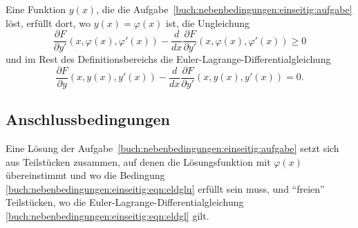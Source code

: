 \begin{satz}
Eine Funktion $y(x)$, die die
Aufgabe~\ref{buch:nebenbedingungen:einseitig:aufgabe}
löst, erfüllt dort, wo $y(x)=\varphi(x)$ ist, die Ungleichung
\begin{equation}
\frac{\partial F}{\partial y'}(x,\varphi(x),\varphi'(x))
-
\frac{d}{dx}\frac{\partial F}{\partial y'}(x,\varphi(x),\varphi'(x))
\ge
0
\label{buch:nebenbedingungen:einseitig:eqn:eldglu}
\end{equation}
und im Rest des Definitionsbereichs die Euler-Lagrange-Differentialgleichung
\begin{equation}
\frac{\partial F}{\partial y}(x,y(x),y'(x))
-
\frac{d}{dx}
\frac{\partial F}{\partial y'}(x,y(x),y'(x))
=
0.
\label{buch:nebenbedingungen:einseitig:eqn:eldgl}
\end{equation}
\end{satz}

%
%
\subsection{Anschlussbedingungen
\label{buch:nebenbedingungen:einseitig:subsection:anschluss}}
Eine Lösung der
Aufgabe~\ref{buch:nebenbedingungen:einseitig:aufgabe}
setzt sich aus Teilstücken zusammen, auf denen die Lösungsfunktion mit
$\varphi(x)$ übereinstimmt und wo die Bedingung
\eqref{buch:nebenbedingungen:einseitig:eqn:eldglu}
erfüllt sein muss, und ``freien'' Teilstücken, wo die
Euler-Lagrange-Differentialgleichung
\eqref{buch:nebenbedingungen:einseitig:eqn:eldgl} gilt.




